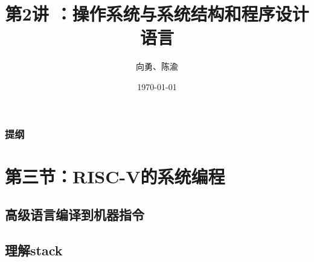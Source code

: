 \documentclass[UTF8]{ctexbeamer}
\title[第2讲]{第2讲 ：操作系统与系统结构和程序设计语言} %
\author{向勇、陈渝} %
\institute[清华大学] %
{
清华大学计算机系 \\ %
\medskip
\textit{xyong,yuchen@tsinghua.edu.cn} %
}
\date{\today} %
\begin{document}
\begin{frame}
\titlepage %
\end{frame}

\begin{frame}
\frametitle{提纲} %
\tableofcontents %
\end{frame}


\section{第三节：RISC-V的系统编程 } %

\subsection{高级语言编译到机器指令} %
\subsection{理解stack}
\end{document}
